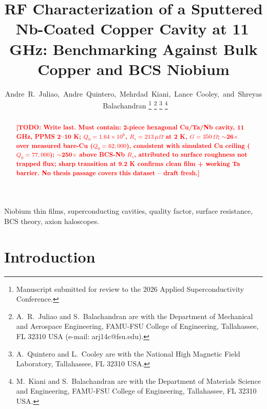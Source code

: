 \documentclass[10pt,journal]{IEEEtran}
\newcommand{\TODO}[1]{\textcolor{red}{\textbf{[TODO: #1]}}}
\begin{document}
\title{RF Characterization of a Sputtered Nb-Coated Copper Cavity at 11\,GHz: Benchmarking Against Bulk Copper and BCS Niobium}

\author{Andre~R.~Juliao,~Andre~Quintero,~Mehrdad~Kiani,~Lance~Cooley,~and~Shreyas~Balachandran%
\thanks{Manuscript submitted for review to the 2026 Applied Superconductivity Conference.}%
\thanks{A.~R.~Juliao and S.~Balachandran are with the Department of Mechanical and Aerospace Engineering, FAMU-FSU College of Engineering, Tallahassee, FL 32310 USA (e-mail: arj14c@fsu.edu).}%
\thanks{A.~Quintero and L.~Cooley are with the National High Magnetic Field Laboratory, Tallahassee, FL 32310 USA.}%
\thanks{M.~Kiani and S.~Balachandran are with the Department of Materials Science and Engineering, FAMU-FSU College of Engineering, Tallahassee, FL 32310 USA.}%
}

\maketitle

\begin{abstract}
\TODO{Write last. Must contain: 2-piece hexagonal Cu/Ta/Nb cavity, 11 GHz, PPMS 2--10 K; $Q_0=1.64\times10^6$, $R_s=213\,\mu\Omega$ at 2 K, $G=350\,\Omega$; $\sim$26$\times$ over measured bare-Cu ($Q_0=62{,}000$), consistent with simulated Cu ceiling ($Q_0=77{,}000$); $\sim$250$\times$ above BCS-Nb $R_s$, attributed to surface roughness not trapped flux; sharp transition at 9.2 K confirms clean film + working Ta barrier. No thesis passage covers this dataset -- draft fresh.}


\end{abstract}

\begin{IEEEkeywords}
Niobium thin films, superconducting cavities, quality factor, surface resistance, BCS theory, axion haloscopes.
\end{IEEEkeywords}

\section{Introduction}
\end{document}
